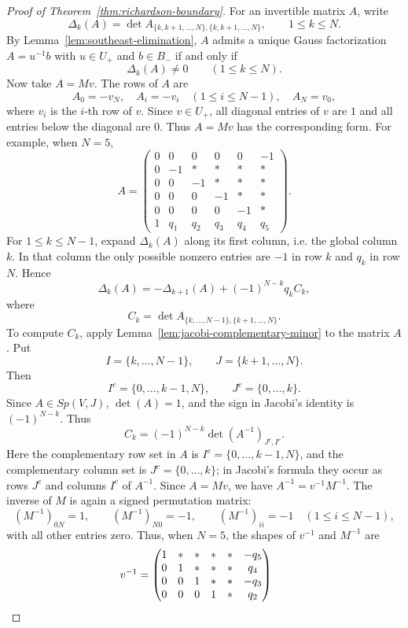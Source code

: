\documentclass[10pt,a4paper]{amsart}
\begin{document}
\begin{proof}[Proof of Theorem~\ref{thm:richardson-boundary}]
For an invertible matrix \(A\), write
\[
\Delta_k(A)=
\det A_{\{k,k+1,\ldots,N\},\{k,k+1,\ldots,N\}},
\qquad
1\le k\le N.
\]
By Lemma~\ref{lem:southeast-elimination}, \(A\) admits a unique Gauss factorization \(A=u^{-1}b\) with \(u\in U_+\) and \(b\in B_-\) if and only if
\[
\Delta_k(A)\ne0\qquad(1\le k\le N).
\]
Now take \(A=Mv\). The rows of \(A\) are
\[ A_0=-v_N,
\quad
A_i=-v_i\quad(1\le i\le N-1),
\quad
A_N=v_0,
\]
where \(v_i\) is the \(i\)-th row of \(v\). Since \(v\in U_+\), all diagonal entries of \(v\) are \(1\) and all entries below the diagonal are \(0\). Thus \(A=Mv\) has the corresponding form. For example, when \(N=5\),
\[
A=
\begin{pmatrix}
0&0&0&0&0&-1\\
0&-1&*&*&*&*\\
0&0&-1&*&*&*\\
0&0&0&-1&*&*\\
0&0&0&0&-1&*\\
1&q_1&q_2&q_3&q_4&q_5
\end{pmatrix}.
\]
For \(1\le k\le N-1\), expand \(\Delta_k(A)\) along its first column, i.e. the global column \(k\). In that column the only possible nonzero entries are \(-1\) in row \(k\) and \(q_k\) in row \(N\). Hence
\[
\Delta_k(A)
=
-\Delta_{k+1}(A)
+(-1)^{N-k}q_kC_k,
\]
where
\[
C_k=
\det A_{\{k,\ldots,N-1\},\{k+1,\ldots,N\}}.
\]
To compute \(C_k\), apply Lemma~\ref{lem:jacobi-complementary-minor} to the matrix \(A\). Put
\[
I=\{k,\ldots,N-1\},
\qquad
J=\{k+1,\ldots,N\}.
\]
Then
\[
I^c=\{0,\ldots,k-1,N\},
\qquad
J^c=\{0,\ldots,k\}.
\]
Since \(A\in Sp(V,J)\), \(\det(A)=1\), and the sign in Jacobi's identity is \((-1)^{N-k}\). Thus
\[
C_k
=
(-1)^{N-k}
\det(A^{-1})_{J^c,I^c}.
\]
Here the complementary row set in \(A\) is \(I^c=\{0,\ldots,k-1,N\}\), and the complementary column set is \(J^c=\{0,\ldots,k\}\); in Jacobi's formula they occur as rows \(J^c\) and columns \(I^c\) of \(A^{-1}\). Since \(A=Mv\), we have \(A^{-1}=v^{-1}M^{-1}\). The inverse of \(M\) is again a signed permutation matrix:
\[
(M^{-1})_{0N}=1,
\qquad
(M^{-1})_{N0}=-1,
\qquad
(M^{-1})_{ii}=-1\quad(1\le i\le N-1),
\]
with all other entries zero. Thus, when \(N=5\), the shapes of \(v^{-1}\) and \(M^{-1}\) are
\[
\begin{array}{c@{\qquad}c}
v^{-1}=
\begin{pmatrix}
1&*&*&*&*&-q_5\\
0&1&*&*&*&q_4\\
0&0&1&*&*&-q_3\\
0&0&0&1&*&q_2\\

\end{pmatrix}
\end{array}\]
\end{proof}
\end{document}
